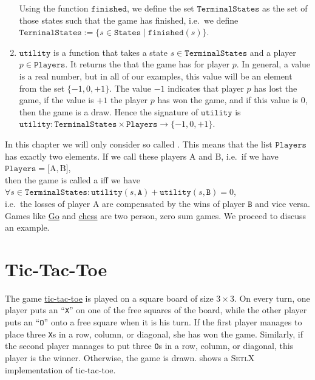 \begin{enumerate}
      Using the function $\texttt{finished}$, we define the set $\texttt{TerminalStates}$ as the set of those
      states such that the game has finished,  i.e.~we define
      \\[0.2cm]
      \hspace*{1.3cm}
      $\texttt{TerminalStates} := \{ s \in \texttt{States} \mid \texttt{finished}(s) \}$.
\item $\texttt{utility}$ is a function that takes a state $s \in \texttt{TerminalStates}$ and a player $p \in \texttt{Players}$.  It returns
      the  that the game has for player $p$.  In general, a value is a real number,  but in all of
      our examples, this value will be an element from the set $\{-1, 0, +1\}$.  The value $-1$ indicates that
      player $p$ has lost the game, if the value is $+1$ the player $p$ has won the game, and if this value is
      $0$, then the game is a draw.  Hence the signature of $\texttt{utility}$ is
      \\[0.2cm]
      \hspace*{1.3cm}
      $\texttt{utility}: \texttt{TerminalStates} \times \texttt{Players} \rightarrow \{ -1, 0, +1\}$.
\end{enumerate}
In this chapter we will only consider so called .  
This means that the list $\texttt{Players}$ has exactly two elements.  If we call these players $\mathrm{A}$ and $\mathrm{B}$, i.e.~if we have
\\[0.2cm]
\hspace*{1.3cm}
$\texttt{Players} = \bigl[ \mathrm{A}, \mathrm{B} \bigr]$,
\\[0.2cm]
then the game is called a  iff we have
\\[0.2cm]
\hspace*{1.3cm}
$\forall s \in \texttt{TerminalStates}:\texttt{utility}(s, \texttt{A}) + \texttt{utility}(s, \texttt{B}) = 0$,
\\[0.2cm]
i.e.~the losses of player $\mathrm{A}$ are compensated by the wins of player $\texttt{B}$ and vice versa.
Games like \href{https://en.wikipedia.org/wiki/Go_(game)}{Go} and 
\href{https://en.wikipedia.org/wiki/Chess}{chess} are two person, zero sum games.
We proceed to discuss an example.

\section{Tic-Tac-Toe}
The game \href{https://en.wikipedia.org/wiki/Tic-tac-toe}{tic-tac-toe} is played on a square board of size 
$3 \times 3$.  On every turn, one player puts an ``\texttt{X}'' on one of the free squares of the board, while
the other player puts an ``$\texttt{O}$'' onto a free square when it is his turn.  If the first player manages
to place three \texttt{X}s in a row, column, or diagonal, she has won the game.  Similarly, if the second
player manages to put three \texttt{O}s in a row, column, or diagonal, this player is the winner.  Otherwise,
the game is drawn.   shows a \textsc{SetlX} implementation of tic-tac-toe.


